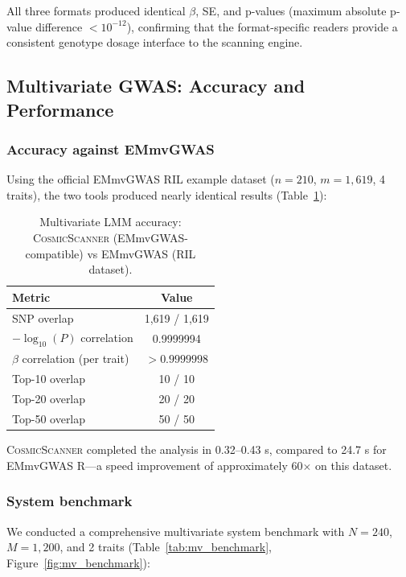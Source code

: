 \documentclass[11pt,a4paper]{article}
\newcommand{\CosmicScanner}{\textsc{CosmicScanner}}
\begin{document}
All three formats produced identical $\beta$, SE, and p-values (maximum absolute p-value difference $< 10^{-12}$), confirming that the format-specific readers provide a consistent genotype dosage interface to the scanning engine.

\subsection{Multivariate GWAS: Accuracy and Performance}

\subsubsection{Accuracy against EMmvGWAS}

Using the official EMmvGWAS RIL example dataset ($n = 210$, $m = 1{,}619$, 4 traits), the two tools produced nearly identical results (Table~\ref{tab:multivariate}):

\begin{table}[H]
  \centering
  \caption{Multivariate LMM accuracy: \CosmicScanner{} (EMmvGWAS-compatible) vs EMmvGWAS (RIL dataset).}
  \label{tab:multivariate}
  \begin{threeparttable}
  \begin{tabular}{lc}
  \toprule
  Metric & Value \\
  \midrule
  SNP overlap & 1,619 / 1,619 \\
  $-\log_{10}(P)$ correlation & 0.9999994 \\
  $\beta$ correlation (per trait) & $> 0.9999998$ \\
  Top-10 overlap & 10 / 10 \\
  Top-20 overlap & 20 / 20 \\
  Top-50 overlap & 50 / 50 \\
  \bottomrule
  \end{tabular}
  \end{threeparttable}
\end{table}

\CosmicScanner{} completed the analysis in 0.32--0.43 s, compared to 24.7 s for EMmvGWAS R---a speed improvement of approximately 60$\times$ on this dataset.

\subsubsection{System benchmark}

We conducted a comprehensive multivariate system benchmark with $N = 240$, $M = 1{,}200$, and 2 traits (Table~\ref{tab:mv_benchmark}, Figure~\ref{fig:mv_benchmark}):
\end{document}
